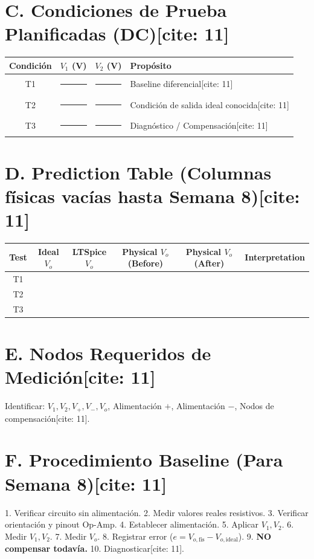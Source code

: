 \documentclass[11pt, a4paper]{article}
\begin{document}
\section*{C. Condiciones de Prueba Planificadas (DC)[cite: 11]}
\begin{table}[h]
    \centering
    \renewcommand{\arraystretch}{1.3}
    \begin{tabularx}{\textwidth}{|c|X|X|X|}
    \hline
    \textbf{Condición} & \textbf{$V_1$ (V)} & \textbf{$V_2$ (V)} & \textbf{Propósito} \\ \hline
    T1 & \rule{3cm}{0.4pt} & \rule{3cm}{0.4pt} & Baseline diferencial[cite: 11] \\ \hline
    T2 & \rule{3cm}{0.4pt} & \rule{3cm}{0.4pt} & Condición de salida ideal conocida[cite: 11] \\ \hline
    T3 & \rule{3cm}{0.4pt} & \rule{3cm}{0.4pt} & Diagnóstico / Compensación[cite: 11] \\ \hline
    \end{tabularx}
\end{table}

\section*{D. Prediction Table (Columnas físicas vacías hasta Semana 8)[cite: 11]}
\begin{table}[h]
    \centering
    \small
    \renewcommand{\arraystretch}{1.5}
    \begin{tabularx}{\textwidth}{|c|c|c|c|c|X|}
    \hline
    \textbf{Test} & \textbf{Ideal $V_o$} & \textbf{LTSpice $V_o$} & \textbf{Physical $V_o$ (Before)} & \textbf{Physical $V_o$ (After)} & \textbf{Interpretation} \\ \hline
    T1 & & & & & \\ \hline
    T2 & & & & & \\ \hline
    T3 & & & & & \\ \hline
    \end{tabularx}
\end{table}

\section*{E. Nodos Requeridos de Medición[cite: 11]}
Identificar: $V_1, V_2, V_+, V_-, V_o$, Alimentación $+$, Alimentación $-$, Nodos de compensación[cite: 11].

\section*{F. Procedimiento Baseline (Para Semana 8)[cite: 11]}
1. Verificar circuito sin alimentación. 2. Medir valores reales resistivos. 3. Verificar orientación y pinout Op-Amp. 4. Establecer alimentación. 5. Aplicar $V_1, V_2$. 6. Medir $V_1, V_2$. 7. Medir $V_o$. 8. Registrar error ($e = V_{o,\mathrm{fis}} - V_{o,\mathrm{ideal}}$). 9. \textbf{NO compensar todavía.} 10. Diagnosticar[cite: 11].
\end{document}
